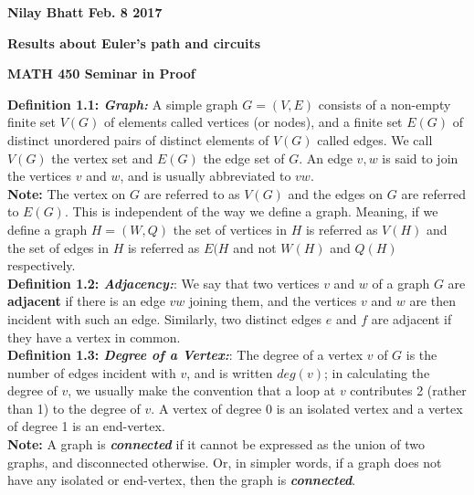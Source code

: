 \documentclass[12pt, fullpage]{article}
\begin{document}
\begin{flushleft}
\textbf{Nilay Bhatt Feb. 8 2017}		
\end{flushleft}
\begin{center}
	\textbf{Results about Euler's path and circuits}
\end{center}
\begin{center}
		
{\bf MATH 450 Seminar in Proof}
 \\
\end{center}
\textbf{Definition 1.1: \textit{Graph: }}A simple graph $G = (V,E)$ consists of a non-empty finite set $V(G)$ of elements called vertices
(or nodes), and a finite set $E(G)$ of distinct unordered pairs of distinct elements of $V(G)$
called edges. We call $V(G)$ the vertex set and $E(G)$ the edge set of $G$. An edge ${v, w}$
is said to join the vertices $v$ and $w$, and is usually abbreviated to $vw$. \\

\textbf{Note:}	The vertex on $G$ are referred to as $V(G)$ and the edges on $G$ are referred to $E(G)$. This is independent of the way we define a graph. Meaning, if we define a graph $H = (W,Q)$ the set of vertices in $H$ is referred as $V(H)$ and the set of edges in $H$ is referred as $E(H$ and not $W(H)$ and  $Q(H)$ respectively.\\

\textbf{Definition 1.2: \textit{Adjacency:}}: We say that two vertices $v$ and $w$ of a graph $G$ are \textbf{adjacent} if there is an edge $vw$ joining
them, and the vertices $v$ and $w$ are then incident with such an edge. Similarly, two
distinct edges $e$ and $f$ are adjacent if they have a vertex in common.\\

\textbf{Definition 1.3: \textit{Degree of a Vertex:}}: The degree of a vertex $v$ of $G$ is the number of edges incident with $v$, and is written
$deg(v)$; in calculating the degree of $v$, we usually make the convention that a loop at $v$
contributes 2 (rather than 1) to the degree of $v$. A vertex of degree 0 is an isolated vertex and a vertex of degree 1 is an end-vertex.\\

\textbf{Note:} A graph is \textit{\textbf{connected}} if it cannot be expressed as the union of two graphs, and disconnected otherwise. Or, in simpler words, if a graph does not have any isolated or end-vertex, then the graph is \textit{\textbf{connected}}. \\
\end{document}
